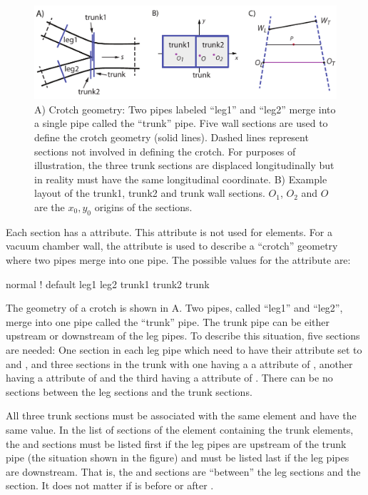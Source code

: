 
\begin{figure}[tb]
  \centering
  \includegraphics[width=6in]{crotch.pdf}
  \caption[vacuum chamber crotch geometry.]
{A) Crotch geometry: Two pipes labeled ``leg1'' and ``leg2'' merge into a single pipe called the
``trunk'' pipe. Five wall sections are used to define the crotch geometry (solid lines). Dashed
lines represent sections not involved in defining the crotch. For purposes of illustration, the
three trunk sections are displaced longitudinally but in reality must have the same longitudinal
coordinate.  B) Example layout of the trunk1, trunk2 and trunk wall sections. $O_1$, $O_2$ and $O$
are the $x_0, y_0$ origins of the sections.}
  \label{f:crotch}
\end{figure}


Each section has a  attribute. This attribute is not used for  elements. For
a vacuum chamber wall, the  attribute is used to describe a ``crotch'' geometry where two
pipes merge into one pipe. The possible values for the  attribute are:
\begin{example}
  normal     ! default
  leg1
  leg2
  trunk1
  trunk2
  trunk
\end{example}
The geometry of a crotch is shown in A. Two pipes, called ``leg1'' and ``leg2'', merge
into one pipe called the ``trunk'' pipe.  The trunk pipe can be either upstream or downstream of the
leg pipes.  To describe this situation, five sections are needed: One section in each leg pipe which
need to have their  attribute set to  and , and three sections in the
trunk with one having a a  attribute of , another having a  attribute
of  and the third having a  attribute of . There can be no sections
between the leg sections and the trunk sections.

All three trunk sections must be associated with the same element and have the same  value. In
the list of sections of the element containing the trunk elements, the  and 
sections must be listed first if the leg pipes are upstream of the trunk pipe (the situation shown
in the figure) and must be listed last if the leg pipes are downstream. That is, the  and
 sections are ``between'' the leg sections and the  section. It does not matter
if  is before or after .

